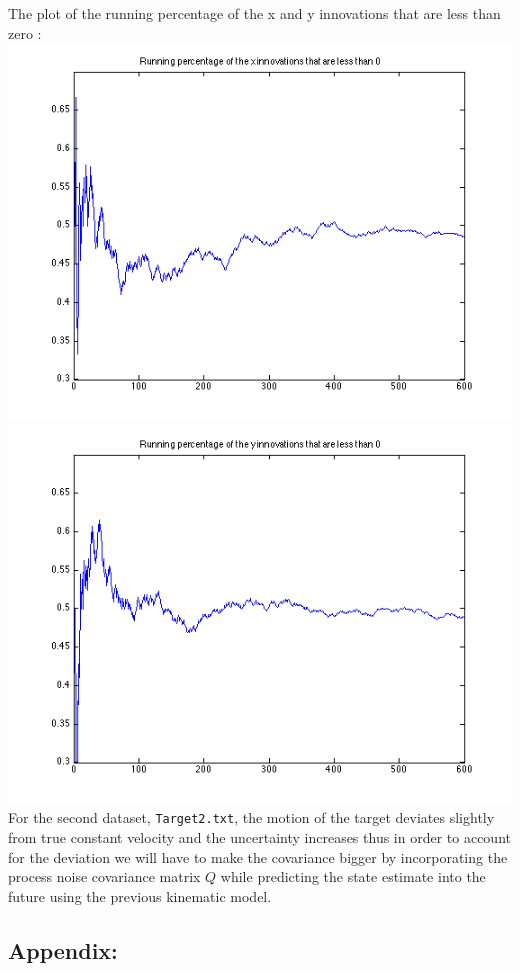 \documentclass[a4paper]{article}
\begin{document}
The plot of the running percentage of the x and y innovations that are less than zero : \\
\includegraphics[scale=.4]{target_1_x_running.png}
\includegraphics[scale=.4]{target_1_y_running.png} \\

For the second dataset, \texttt{Target2.txt}, the motion of the target deviates slightly from true constant velocity and the uncertainty increases thus in order to account for the deviation we will have to make the covariance bigger by incorporating the process noise covariance matrix $Q$ while predicting the state estimate into the future using the previous kinematic model.

\newpage
\subsection*{Appendix:}






\end{document}
